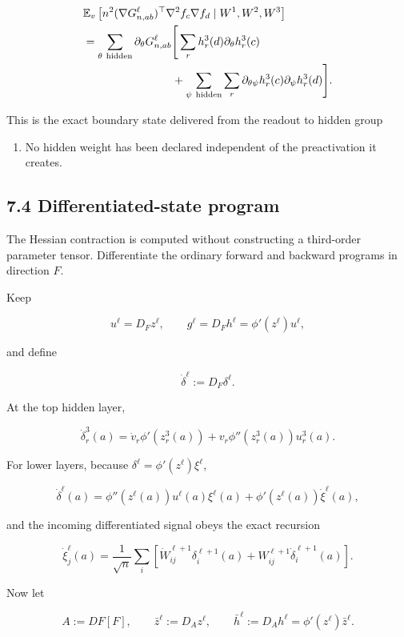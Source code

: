\[
\begin{aligned}
&\mathbb E_v\left[
n^2(\nabla G^\ell_{n,ab})^{\top}
\nabla^2f_c\nabla f_d
\mid W^1,W^2,W^3
\right]
\\
&=
\sum_{\theta\ {\rm hidden}}
\partial_\theta G^\ell_{n,ab}
\Bigg[
\sum_rh_r^3(d)\partial_\theta h_r^3(c)
\\
&\hspace{28mm}
+
\sum_{\psi\ {\rm hidden}}\sum_r
\partial_{\theta\psi}h_r^3(c)
\partial_\psi h_r^3(d)
\Bigg].
\end{aligned}
\]


This is the exact boundary state delivered from the readout to hidden group
\begin{enumerate}
\item No hidden weight has been declared independent of the preactivation it
creates.
\end{enumerate}


\subsection*{7.4 Differentiated-state program}


The Hessian contraction is computed without constructing a third-order
parameter tensor. Differentiate the ordinary forward and backward programs
in direction \(F\).

Keep

\[
u^\ell=D_Fz^\ell,
\qquad
g^\ell=D_Fh^\ell=\phi'(z^\ell)u^\ell,
\]


and define

\[
\dot\delta^\ell:=D_F\delta^\ell.
\]


At the top hidden layer,

\[
\dot\delta_r^3(a)
=
\dot v_r\phi'(z_r^3(a))
+v_r\phi''(z_r^3(a))u_r^3(a).
\]


For lower layers, because
\(\delta^\ell=\phi'(z^\ell)\xi^\ell\),

\[
\dot\delta^\ell(a)
=
\phi''(z^\ell(a))u^\ell(a)\xi^\ell(a)
+\phi'(z^\ell(a))\dot\xi^\ell(a),
\]


and the incoming differentiated signal obeys the exact recursion

\[
\dot\xi_j^\ell(a)
=
\frac1{\sqrt n}\sum_i
\left[
\dot W^{\ell+1}_{ij}\delta_i^{\ell+1}(a)
+W^{\ell+1}_{ij}\dot\delta_i^{\ell+1}(a)
\right].
\]


Now let

\[
A:=DF[F],
\qquad
\bar z^\ell:=D_Az^\ell,
\qquad
\bar h^\ell:=D_Ah^\ell
=
\phi'(z^\ell)\bar z^\ell.
\]


